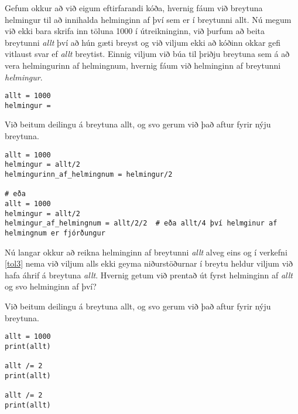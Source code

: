 \begin{exercise}\label{tol3}
	Gefum okkur að við eigum eftirfarandi kóða, hvernig fáum við breytuna helmingur til að innihalda helminginn af því sem er í breytunni allt.
	Nú megum við ekki bara skrifa inn töluna 1000 í útreikninginn, við þurfum að beita breytunni \textit{allt} því að hún gæti breyst og við viljum ekki að kóðinn okkar gefi vitlaust svar ef \textit{allt} breytist.
	Einnig viljum við búa til þriðju breytuna sem á að vera helmingurinn af helmingnum, hvernig fáum við helminginn af breytunni \textit{helmingur}.
\begin{lstlisting}
allt = 1000
helmingur =\end{lstlisting}
\end{exercise}
\begin{Answer}[ref={tol3}]
	Við beitum deilingu á breytuna allt, og svo gerum við það aftur fyrir nýju breytuna.
\begin{lstlisting}
allt = 1000
helmingur = allt/2
helmingurinn_af_helmingnum = helmingur/2

# eða
allt = 1000
helmingur = allt/2
helmingur_af_helmingnum = allt/2/2  # eða allt/4 því helmginur af helmingnum er fjórðungur\end{lstlisting}
\end{Answer}


\begin{exercise}\label{tol4}
	Nú langar okkur að reikna helminginn af breytunni \textit{allt} alveg eins og í verkefni \ref{tol3} nema við viljum alls ekki geyma niðurstöðurnar í breytu heldur viljum við hafa áhrif á breytuna \textit{allt}.
	Hvernig getum við prentað út fyrst helminginn af \textit{allt} og svo helminginn af því?
\end{exercise}
\begin{Answer}[ref={tol4}]
	Við beitum deilingu á breytuna allt, og svo gerum við það aftur fyrir nýju breytuna.
\begin{lstlisting}
allt = 1000
print(allt)

allt /= 2
print(allt)

allt /= 2
print(allt)\end{lstlisting}
\end{Answer}

